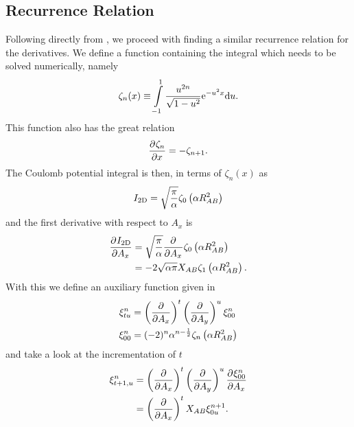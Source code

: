 \subsection{Recurrence Relation\label{sub:445}}
    Following directly from \cite{HelgakerTaylorGauss}, we proceed with finding
    a similar recurrence relation for the derivatives. We define a function
    containing the integral which needs to be solved numerically, namely 
        \begin{equation}
            \zeta_n(x) \equiv \int\limits^1_{-1} \frac{u^{2n}}{\sqrt{1 -
            u^2}} \mathrm{e}^{-u^2x} \mathrm{d} u.
            \label{eq:zetaDef}
        \end{equation}
    This function also has the great relation
        \begin{equation}
            \prd{x}[\zeta_n] = -\zeta_{n+1}.
        \end{equation}
    The Coulomb potential integral is then, in terms of $\zeta_n(x)$ as
        \begin{equation}
            I_{\text{2D}} = \sqrt{\frac{\pi}{\alpha}} \zeta_0\left(\alpha
            R^2_{AB}\right)
        \end{equation}
    and the first derivative with respect to $A_x$ is
        \begin{align}
            \prd{A_x}[\twoDI] &= \sqrt{\frac{\pi}{\alpha}} \prd{A_x}
            \zeta_0\left(\alpha R^2_{AB}\right) \nonumber \\
            &= -2\sqrt{\alpha\pi}X_{AB}\zeta_1\left(\alpha R^2_{AB}\right).
        \end{align}
    With this we define an auxiliary function given in 
        \begin{equation}
            \begin{aligned}
                \xi^n_{tu} &=\left(\frac{\mathrm{\partial}}{\mathrm{\partial} A_x}\right)^{t}\left(\frac{\mathrm{\partial}}{\mathrm{\partial} A_y}\right)^{u} \xi^n_{00} \\
                \xi^n_{00} &= (-2)^n\alpha^{n-\frac{1}{2}} \zeta_n\left(\alpha
                R^2_{AB}\right)
            \end{aligned}
            \label{eq:auxiliary2d1}
        \end{equation}
    and take a look at the incrementation of $t$
        \begin{align}
            \xi^n_{t+1,u} &= \prdp{A_x}{t}\prdp{A_y}{u} \prd{A_x}[\xi^n_{00}]
            \nonumber \\
            &= \prdp{A_x}{t}X_{AB}\xi^{n+1}_{0u}.
            \label{eq:Rtincr}
        \end{align}
